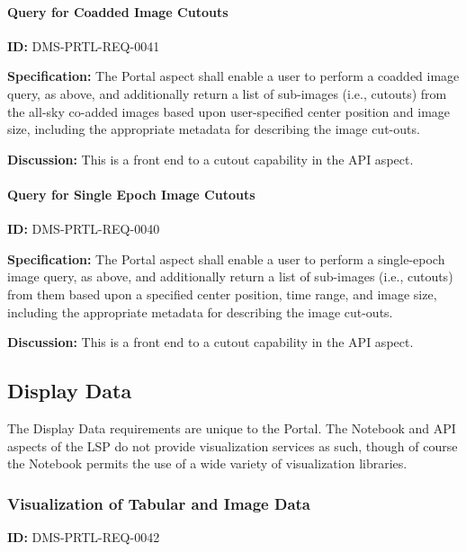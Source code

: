 \documentclass[SE,toc,lsstdraft]{lsstdoc}
\begin{document}
\paragraph{Query for Coadded Image Cutouts}\hfill  %

\label{DMS-PRTL-REQ-0041}
\textbf{ID:} DMS-PRTL-REQ-0041

\textbf{Specification:}
The Portal aspect shall enable a user to perform a coadded image query, as above, and additionally return a list of sub-images (i.e., cutouts) from the all-sky co-added images based upon user-specified center position and image size, including the appropriate metadata for describing the image cut-outs.

\textbf{Discussion:}
This is a front end to a cutout capability in the API aspect.

\paragraph{Query for Single Epoch Image Cutouts}\hfill  %

\label{DMS-PRTL-REQ-0040}
\textbf{ID:} DMS-PRTL-REQ-0040

\textbf{Specification:}
The Portal aspect shall enable a user to perform a single-epoch image query, as above, and additionally return a list of sub-images (i.e., cutouts) from them based upon a specified center position, time range, and image size, including the appropriate metadata for describing the image cut-outs.

\textbf{Discussion:}
This is a front end to a cutout capability in the API aspect.

\subsection{Display Data}

The Display Data requirements are unique to the Portal.  The Notebook and API aspects of the LSP do not provide visualization services as such, though of course the Notebook permits the use of a wide variety of visualization libraries.

\subsubsection{Visualization of Tabular and Image Data}

\label{DMS-PRTL-REQ-0042}
\textbf{ID:} DMS-PRTL-REQ-0042
\end{document}
